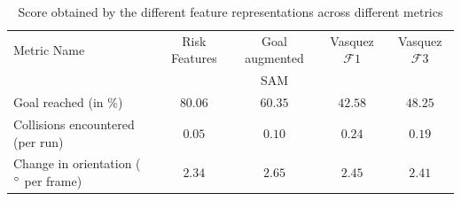 \begin{table}[htbp]
	\begin{center}
		\renewcommand{\arraystretch}{1.3}
		\begin{tabular}{|p{2.5cm}|c|c|c|c|}
			\hline
			Metric Name & Risk Features & Goal augmented  & Vasquez $\mathcal{F}1$  & Vasquez $\mathcal{F}3$ \\
			&   & SAM  & &  \\
			\hline
			Goal reached (in $\%$) & $80.06$ & $60.35$ & $42.58$ & $48.25$ \\
			Collisions encountered (per run) & $0.05$ & $0.10$ & $ 0.24$ & $0.19$ \\
			Change in orientation ( $\degree$ per frame) & $2.34$ & $2.65$ &  $2.45$ & $2.41$\\
			\hline
		\end{tabular}
	\end{center}
	\caption{Score obtained by the different feature representations across different metrics}
	\label{tab:inter_irl_numerical_results_zara02}
\end{table}


